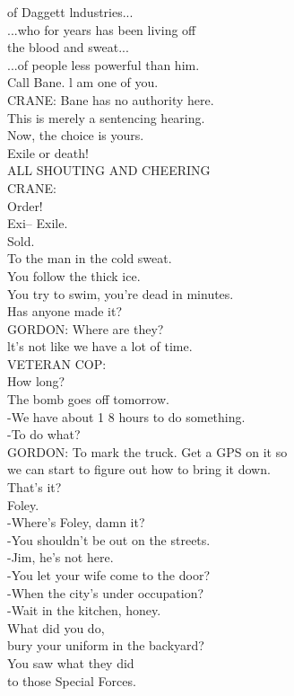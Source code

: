 \documentclass{article}
\begin{document}
\begin{multicols}{3}
of Daggett lndustries...\\
...who for years has been living off\\
the blood and sweat...\\
...of people less powerful than him.\\
Call Bane. l am one of you.\\
CRANE: Bane has no authority here.\\
This is merely a sentencing hearing.\\
Now, the choice is yours.\\
Exile or death!\\
ALL SHOUTING AND CHEERING\\
CRANE:\\
Order!\\
Exi-- Exile.\\
Sold.\\
To the man in the cold sweat.\\
You follow the thick ice.\\
You try to swim, you're dead in minutes.\\
Has anyone made it?\\
GORDON: Where are they?\\
lt's not like we have a lot of time.\\
VETERAN COP:\\
How long?\\
The bomb goes off tomorrow.\\
-We have about 1 8 hours to do something.\\
-To do what?\\
GORDON: To mark the truck. Get a GPS on it so\\
we can start to figure out how to bring it down.\\
That's it?\\
Foley.\\
-Where's Foley, damn it?\\
-You shouldn't be out on the streets.\\
-Jim, he's not here.\\
-You let your wife come to the door?\\
-When the city's under occupation?\\
-Wait in the kitchen, honey.\\
What did you do,\\
bury your uniform in the backyard?\\
You saw what they did\\
to those Special Forces.\\

\end{multicols}
\end{document}
